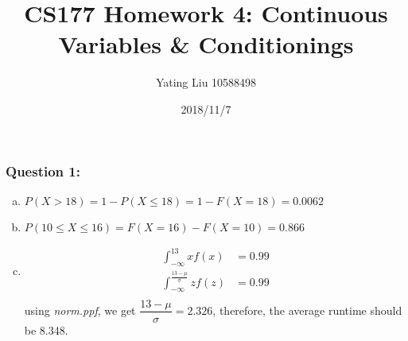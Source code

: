 \documentclass[12pt]{article}
\title{CS177 Homework 4: Continuous Variables \& Conditionings}
\author{Yating Liu 10588498}
\date{2018/11/7}
\begin{document}
\maketitle

\noindent

\subsubsection*{Question 1:} 
\begin{enumerate}[a)]
  \item 
  $P(X>18) = 1-P(X \leq 18) = 1 - F(X=18) = 0.0062$

  \item 
  $P(10 \leq X \leq 16) = F(X=16) - F(X=10) = 0.866$

  \item
  \begin{align*}
  \int_{-\infty}^{13} xf(x) &= 0.99 \\
  \int_{-\infty}^{\frac{13-\mu}{\sigma}} zf(z) &= 0.99 \\
  \end{align*}
  using \emph{norm.ppf}, we get $\dfrac{13-\mu}{\sigma}=2.326$, therefore, the average runtime should be 8.348.
  

 
\end{enumerate}
\end{document}
